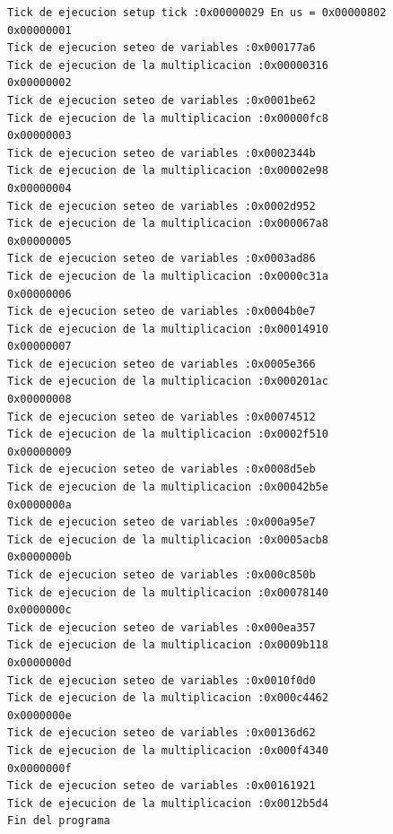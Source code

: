 \newpage
\begin{lstlisting}[caption={Salida de la terminal serie durante la ejecución del programa multmat.or32},label={lst:salidamult}]
Tick de ejecucion setup tick :0x00000029 En us = 0x00000802
0x00000001
Tick de ejecucion seteo de variables :0x000177a6
Tick de ejecucion de la multiplicacion :0x00000316
0x00000002
Tick de ejecucion seteo de variables :0x0001be62
Tick de ejecucion de la multiplicacion :0x00000fc8
0x00000003
Tick de ejecucion seteo de variables :0x0002344b
Tick de ejecucion de la multiplicacion :0x00002e98
0x00000004
Tick de ejecucion seteo de variables :0x0002d952
Tick de ejecucion de la multiplicacion :0x000067a8
0x00000005
Tick de ejecucion seteo de variables :0x0003ad86
Tick de ejecucion de la multiplicacion :0x0000c31a
0x00000006
Tick de ejecucion seteo de variables :0x0004b0e7
Tick de ejecucion de la multiplicacion :0x00014910
0x00000007
Tick de ejecucion seteo de variables :0x0005e366
Tick de ejecucion de la multiplicacion :0x000201ac
0x00000008
Tick de ejecucion seteo de variables :0x00074512
Tick de ejecucion de la multiplicacion :0x0002f510
0x00000009
Tick de ejecucion seteo de variables :0x0008d5eb
Tick de ejecucion de la multiplicacion :0x00042b5e
0x0000000a
Tick de ejecucion seteo de variables :0x000a95e7
Tick de ejecucion de la multiplicacion :0x0005acb8
0x0000000b
Tick de ejecucion seteo de variables :0x000c850b
Tick de ejecucion de la multiplicacion :0x00078140
0x0000000c
Tick de ejecucion seteo de variables :0x000ea357
Tick de ejecucion de la multiplicacion :0x0009b118
0x0000000d
Tick de ejecucion seteo de variables :0x0010f0d0
Tick de ejecucion de la multiplicacion :0x000c4462
0x0000000e
Tick de ejecucion seteo de variables :0x00136d62
Tick de ejecucion de la multiplicacion :0x000f4340
0x0000000f
Tick de ejecucion seteo de variables :0x00161921
Tick de ejecucion de la multiplicacion :0x0012b5d4
Fin del programa

\end{lstlisting}


